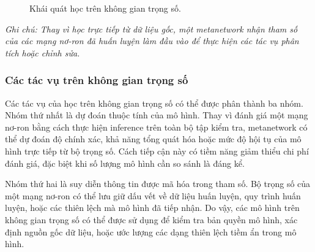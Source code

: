 \begin{figure}[H]
    \centering
    
    \caption[Khái quát học trên không gian trọng số]{Khái quát học trên không gian trọng số.}
    \label{fig:weight-space-learning-pipeline}
    
    \vspace{0.15cm}
    \begin{minipage}{0.9\linewidth}
        \centering
    \end{minipage}
\end{figure}
\vspace{-2.0em}
\noindent\textit{Ghi chú: Thay vì học trực tiếp từ dữ liệu gốc, một metanetwork nhận tham số của các mạng nơ-ron đã huấn luyện làm đầu vào để thực hiện các tác vụ phân tích hoặc chỉnh sửa.}

\subsubsection{Các tác vụ trên không gian trọng số}

Các tác vụ của học trên không gian trọng số có thể được phân thành ba nhóm. Nhóm thứ nhất là dự đoán thuộc tính của mô hình. Thay vì đánh giá một mạng nơ-ron bằng cách thực hiện inference trên toàn bộ tập kiểm tra, metanetwork có thể dự đoán độ chính xác, khả năng tổng quát hóa hoặc mức độ hội tụ của mô hình trực tiếp từ bộ trọng số. Cách tiếp cận này có tiềm năng giảm thiểu chi phí đánh giá, đặc biệt khi số lượng mô hình cần so sánh là đáng kể.

Nhóm thứ hai là suy diễn thông tin được mã hóa trong tham số. Bộ trọng số của một mạng nơ-ron có thể lưu giữ dấu vết về dữ liệu huấn luyện, quy trình huấn luyện, hoặc các thiên lệch mà mô hình đã tiếp nhận. Do vậy, các mô hình trên không gian trọng số có thể được sử dụng để kiểm tra bản quyền mô hình, xác định nguồn gốc dữ liệu, hoặc ước lượng các dạng thiên lệch tiềm ẩn trong mô hình.

